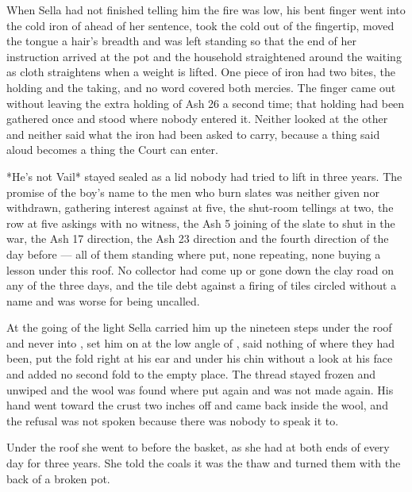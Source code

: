 When Sella had not finished telling him the fire was low, his bent finger went into the cold iron of  ahead of her sentence, took the cold out of the fingertip, moved the tongue a hair's breadth and was left standing so that the end of her instruction arrived at the pot and the household straightened around the waiting as cloth straightens when a weight is lifted. One piece of iron had two bites, the holding and the taking, and no  word covered both mercies. The finger came out without leaving the extra holding of Ash 26 a second time; that holding had been gathered once and stood where nobody entered it. Neither looked at the other and neither said what the iron had been asked to carry, because a thing said aloud becomes a thing the Court can enter.

\scenebreak

*He's not Vail* stayed sealed as a lid nobody had tried to lift in three years. The promise of the boy's name to the men who burn slates was neither given nor withdrawn, gathering interest against  at five, the shut-room tellings at two, the row at five askings with no witness, the Ash 5 joining of the slate to  shut in the war, the Ash 17 direction, the Ash 23 direction and the fourth direction of the day before --- all of them standing where put, none repeating, none buying a lesson under this roof. No collector had come up or gone down the clay road on any of the three days, and the tile debt against a firing of tiles circled without a name and was worse for being uncalled.

At the going of the light Sella carried him up the nineteen steps under the roof and never into , set him on  at the low angle of , said nothing of where they had been, put the fold right at his ear and under his chin without a look at his face and added no second fold to the empty place. The thread stayed frozen and unwiped and the wool was found where put again and was not made again. His hand went toward the crust two inches off and came back inside the wool, and the refusal was not spoken because there was nobody to speak it to.

Under the roof she went to  before the basket, as she had at both ends of every day for three years. She told the coals it was the thaw and turned them with the back of a broken pot.

